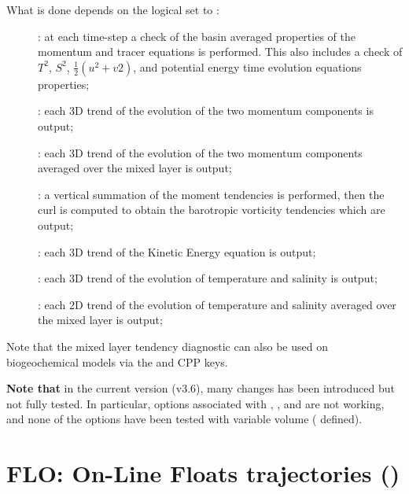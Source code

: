 \documentclass[../main/NEMO_manual]{subfiles}
\begin{document}
What is done depends on the  logical set to :

\begin{description}
\item[]:
  at each  time-step a check of the basin averaged properties of
  the momentum and tracer equations is performed.
  This also includes a check of $T^2$, $S^2$, $\tfrac{1}{2} (u^2+v2)$,
  and potential energy time evolution equations properties;
\item[]:
  each 3D trend of the evolution of the two momentum components is output;
\item[]:
  each 3D trend of the evolution of the two momentum components averaged over the mixed layer is output;
\item[]:
  a vertical summation of the moment tendencies is performed,
  then the curl is computed to obtain the barotropic vorticity tendencies which are output;
\item[] :
  each 3D trend of the Kinetic Energy equation is output;
\item[]:
  each 3D trend of the evolution of temperature and salinity is output;
\item[]:
  each 2D trend of the evolution of temperature and salinity averaged over the mixed layer is output;
\end{description}

Note that the mixed layer tendency diagnostic can also be used on biogeochemical models via 
the  and  CPP keys.

\textbf{Note that} in the current version (v3.6), many changes has been introduced but not fully tested.
In particular, options associated with , , and  are not working,
and none of the options have been tested with variable volume (\ie {} defined).

\section{FLO: On-Line Floats trajectories (\protect{})}
\label{sec:FLO}
\end{document}
